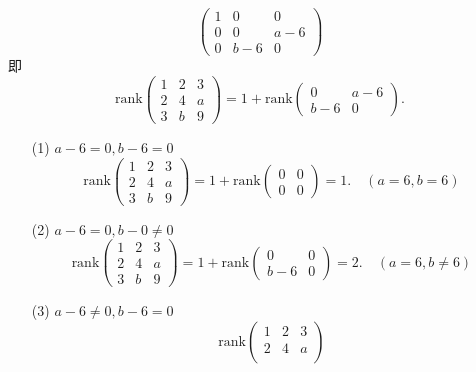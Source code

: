 \documentclass{article}
\begin{document}
\begin{enumerate}
\[\begin{pmatrix}
                1 & 0 & 0\\
                0 & 0 & a-6\\
                0 & b-6 & 0
            \end{pmatrix}
        \]
        即
        \[
            \mbox{rank}\begin{pmatrix}
                1 & 2 & 3\\
                2 & 4 & a\\
                3 & b & 9
            \end{pmatrix}=
            1+\mbox{rank}\begin{pmatrix}
                0 & a-6\\
                b-6 & 0
            \end{pmatrix}.
        \]
        \begin{enumerate}
            \item [(1)]$a-6=0,b-6=0$
            \[
                \mbox{rank}\begin{pmatrix}
                    1 & 2 & 3\\
                    2 & 4 & a\\
                    3 & b & 9
                \end{pmatrix}=
                1+\mbox{rank}\begin{pmatrix}
                    0 & 0\\
                    0 & 0
                \end{pmatrix}=1.\quad (a=6,b=6)
            \]
            \item [(2)]$a-6=0,b-0\neq 0$
            \[
                \mbox{rank}\begin{pmatrix}
                    1 & 2 & 3\\
                    2 & 4 & a\\
                    3 & b & 9
                \end{pmatrix}=
                1+\mbox{rank}\begin{pmatrix}
                    0 & 0\\
                    b-6 & 0
                \end{pmatrix}=2.\quad (a=6,b\neq 6)
            \]
            \item [(3)]$a-6\neq 0,b-6=0$
            \[
                \mbox{rank}\begin{pmatrix}
                    1 & 2 & 3\\
                    2 & 4 & a\\

\end{pmatrix}\]
\end{enumerate}
\end{enumerate}
\end{document}
